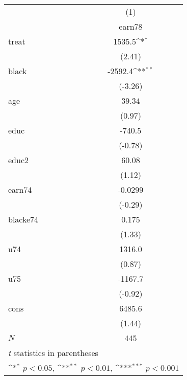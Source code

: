 {
\def\sym#1{\ifmmode^{#1}\else\(^{#1}\)\fi}
\begin{tabular}{l*{1}{c}}
\hline\hline
            &\multicolumn{1}{c}{(1)}\\
            &\multicolumn{1}{c}{earn78}\\
\hline
treat       &      1535.5\sym{*}  \\
            &      (2.41)         \\
[1em]
black       &     -2592.4\sym{**} \\
            &     (-3.26)         \\
[1em]
age         &       39.34         \\
            &      (0.97)         \\
[1em]
educ        &      -740.5         \\
            &     (-0.78)         \\
[1em]
educ2       &       60.08         \\
            &      (1.12)         \\
[1em]
earn74      &     -0.0299         \\
            &     (-0.29)         \\
[1em]
blacke74    &       0.175         \\
            &      (1.33)         \\
[1em]
u74         &      1316.0         \\
            &      (0.87)         \\
[1em]
u75         &     -1167.7         \\
            &     (-0.92)         \\
[1em]
cons        &      6485.6         \\
            &      (1.44)         \\
\hline
\(N\)       &         445         \\
\hline\hline
\multicolumn{2}{l}{\footnotesize \textit{t} statistics in parentheses}\\
\multicolumn{2}{l}{\footnotesize \sym{*} \(p<0.05\), \sym{**} \(p<0.01\), \sym{***} \(p<0.001\)}\\
\end{tabular}
}
